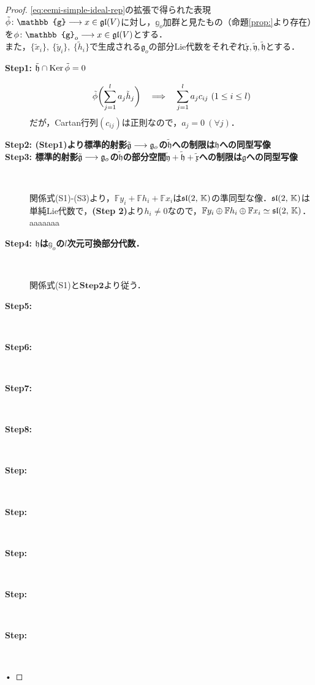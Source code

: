 \documentclass[rep_main]{subfiles}
\begin{document}
\begin{proof}
	\eqref{eq:eemi-simple-ideal-rep}の拡張で得られた表現$\tilde{\phi}\colon \mathbb{g} \lto x \in \Lgl(V)$に対し，$\mathbb{g}_o$加群と見たもの（命題\ref{prop:}より存在）を$\phi\colon \mathbb{g}_o \lto x \in \Lgl(V)$とする．\\
	また，$\{\tilde{x}_i\},\ \{\tilde{y}_i\},\ \{\tilde{h}_i\}$で生成される$\mathfrak{g}_o$の部分Lie代数をそれぞれ$\tilde{\mathfrak{x}}, \tilde{\mathfrak{y}}, \tilde{\mathfrak{h}}$とする．
	\begin{description}
		\item[\textbf{Step1: $\tilde{\mathfrak{h}} \cap \operatorname{Ker}\tilde{\phi} = 0$}]
		\begin{equation}
			\tilde{\phi}\biggl(\sum_{j=1}^l a_j\tilde{h}_j \biggr)  \quad \Longrightarrow \quad  \sum_{j=1}^l a_jc_{ij}\  (1 \leq i \leq l)
		\end{equation}
		だが，Cartan行列$(c_{ij})$は正則なので，$a_j = 0\ (\forall j)$．
		\item[\textbf{Step2: (Step1)より標準的射影$\tilde{\mathfrak{g}} \longrightarrow \mathfrak{g}_o$の$\tilde{\mathfrak{h}}$への制限は$\mathfrak{h}$への同型写像}]
		\item[\textbf{Step3: 標準的射影$\tilde{\mathfrak{g}} \longrightarrow \mathfrak{g}_o$の$\tilde{\mathfrak{h}}$の部分空間$\tilde{\mathfrak{y}} + \tilde{\mathfrak{h}} + \tilde{\mathfrak{x}}$への制限は$\mathfrak{g}$への同型写像}]　
		
		関係式(S1)-(S3)より，$\mathbb{F}y_i + \mathbb{F}h_i + \mathbb{F}x_i$は$\mathfrak{sl}(2,\, \mathbb{K})$の準同型な像．$\mathfrak{sl}(2,\, \mathbb{K})$は単純Lie代数で，\textbf{(Step 2)}より$h_i \neq 0$なので，$\mathbb{F}y_i \oplus \mathbb{F}h_i \oplus \mathbb{F}x_i \simeq \mathfrak{sl}(2,\, \mathbb{K})$．\\
		
		aaaaaaa
		
		\item[\textbf{Step4: $\mathfrak{h}$は$\mathbb{g}_o$の$l$次元可換部分代数．}]　
		
		関係式(S1)と$\textbf{Step2}$より従う．
		\item[\textbf{Step5: }]　
		
		\item[\textbf{Step6: }]　
		
		\item[\textbf{Step7: }]　
		
		\item[\textbf{Step8: }]　
		
		\item[\textbf{Step: }]　
		
		\item[\textbf{Step: }]　
		
		\item[\textbf{Step: }]　
		
		\item[\textbf{Step: }]　
		
		\item[\textbf{Step: }]　
		
	\end{description}•
\end{proof}
\end{document}
